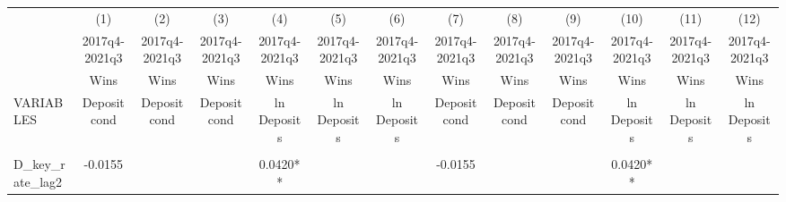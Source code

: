 \documentclass[]{article}
\begin{document}
\begin{center}
\begin{tabular}{lcccccccccccc} \hline
 & (1) & (2) & (3) & (4) & (5) & (6) & (7) & (8) & (9) & (10) & (11) & (12) \\
 & 2017q4-2021q3 & 2017q4-2021q3 & 2017q4-2021q3 & 2017q4-2021q3 & 2017q4-2021q3 & 2017q4-2021q3 & 2017q4-2021q3 & 2017q4-2021q3 & 2017q4-2021q3 & 2017q4-2021q3 & 2017q4-2021q3 & 2017q4-2021q3 \\
 & Wins & Wins & Wins & Wins & Wins & Wins & Wins & Wins & Wins & Wins & Wins & Wins \\
VARIABLES & Deposit cond & Deposit cond & Deposit cond & ln Deposits & ln Deposits & ln Deposits & Deposit cond & Deposit cond & Deposit cond & ln Deposits & ln Deposits & ln Deposits \\ \hline
\vspace{4pt} & \begin{footnotesize}\end{footnotesize} & \begin{footnotesize}\end{footnotesize} & \begin{footnotesize}\end{footnotesize} & \begin{footnotesize}\end{footnotesize} & \begin{footnotesize}\end{footnotesize} & \begin{footnotesize}\end{footnotesize} & \begin{footnotesize}\end{footnotesize} & \begin{footnotesize}\end{footnotesize} & \begin{footnotesize}\end{footnotesize} & \begin{footnotesize}\end{footnotesize} & \begin{footnotesize}\end{footnotesize} & \begin{footnotesize}\end{footnotesize} \\
D\_key\_rate\_lag2 & -0.0155 &  &  & 0.0420** &  &  & -0.0155 &  &  & 0.0420** &  &  \\

\end{tabular}
\end{center}
\end{document}

